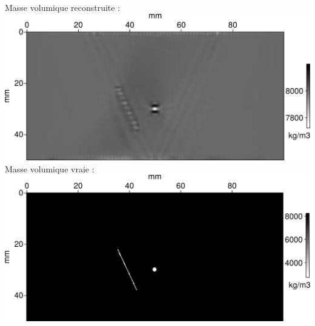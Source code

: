 \documentclass[10pt,xcolor=x11names,compress, notes=show]{beamer}%
\begin{document}
\begin{frame}{\insertsubsectionhead}
\begin{footnotesize}
\begin{columns}
			\centering
			Masse volumique reconstruite :  \\[0.2cm]
			\includegraphics[width=\textwidth]{img/rho_mono/rho_mono.png}\\
	
			\centering
			Masse volumique vraie : \\[0.2cm]
			\includegraphics[width=\textwidth]{img/rho_true.png}
		\end{columns}

\end{footnotesize}		
\end{frame}
\end{document}
